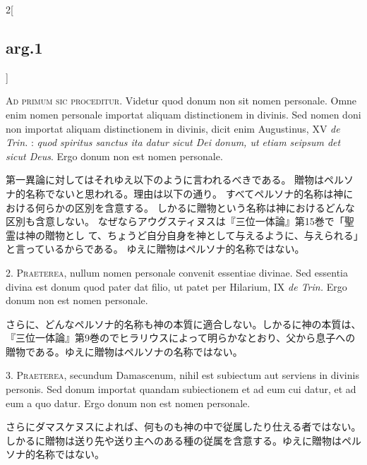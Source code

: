 \documentclass[paper=a4paper,fontsize=10pt,jafontsize=9pt,titlepage]{jlreq}
\begin{document}
\begin{paracol}{2}[\subsection{arg.1}]

\textsc{Ad primum sic proceditur}. Videtur quod donum non sit nomen
    personale. Omne enim nomen personale importat aliquam
    distinctionem in divinis. Sed nomen doni non importat aliquam
    distinctionem in divinis, dicit enim Augustinus, XV \textit{de
    Trin.} : \textit{quod spiritus sanctus ita datur sicut Dei donum,
    ut etiam seipsum det sicut Deus}. Ergo donum non est nomen
    personale.

\switchcolumn

第一異論に対してはそれゆえ以下のように言われるべきである。
贈物はペルソナ的名称でないと思われる。理由は以下の通り。
すべてペルソナ的名称は神における何らかの区別を含意する。
しかるに贈物という名称は神におけるどんな区別も含意しない。
なぜならアウグスティヌスは『三位一体論』第15巻で「聖霊は神の贈物とし
て、ちょうど自分自身を神として与えるように、与えられる」と言っているからである。
ゆえに贈物はペルソナ的名称ではない。


2. \textsc{Praeterea}, nullum nomen personale convenit essentiae divinae. Sed
essentia divina est donum quod pater dat filio, ut patet per Hilarium, IX
\textit{de Trin.} Ergo donum non est nomen personale.

\switchcolumn

さらに、どんなペルソナ的名称も神の本質に適合しない。しかるに神の本質は、『三位一体論』第9巻のでヒラリウスによって明らかなとおり、父から息子への贈物である。ゆえに贈物はペルソナの名称ではない。


3. \textsc{Praeterea}, secundum Damascenum, nihil est subiectum aut serviens in
divinis personis. Sed donum importat quandam subiectionem et ad eum cui datur,
et ad eum a quo datur. Ergo donum non est nomen personale.

\switchcolumn

さらにダマスケヌスによれば、何ものも神の中で従属したり仕える者ではない。しかるに贈物は送り先や送り主へのある種の従属を含意する。ゆえに贈物はペルソナ的名称ではない。


\end{paracol}
\end{document}
